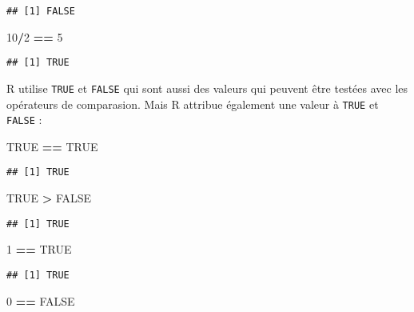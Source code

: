 \documentclass[]{book}
\newenvironment{Shaded}{\begin{snugshade}}{\end{snugshade}}
\newcommand{\DecValTok}[1]{\textcolor[rgb]{0.00,0.00,0.81}{#1}}
\newcommand{\StringTok}[1]{\textcolor[rgb]{0.31,0.60,0.02}{#1}}
\newcommand{\OtherTok}[1]{\textcolor[rgb]{0.56,0.35,0.01}{#1}}
\newcommand{\OperatorTok}[1]{\textcolor[rgb]{0.81,0.36,0.00}{\textbf{#1}}}
\theoremstyle{definition}
\theoremstyle{definition}
\theoremstyle{definition}
\theoremstyle{remark}
\begin{document}
\begin{verbatim}
## [1] FALSE
\end{verbatim}

\begin{Shaded}
\begin{Highlighting}[]
\DecValTok{10}\OperatorTok{/}\DecValTok{2} \OperatorTok{==}\StringTok{ }\DecValTok{5}
\end{Highlighting}
\end{Shaded}

\begin{verbatim}
## [1] TRUE
\end{verbatim}

R utilise \texttt{TRUE} et \texttt{FALSE} qui sont aussi des valeurs qui
peuvent être testées avec les opérateurs de comparasion. Mais R attribue
également une valeur à \texttt{TRUE} et \texttt{FALSE} :

\begin{Shaded}
\begin{Highlighting}[]
\OtherTok{TRUE} \OperatorTok{==}\StringTok{ }\OtherTok{TRUE}
\end{Highlighting}
\end{Shaded}

\begin{verbatim}
## [1] TRUE
\end{verbatim}

\begin{Shaded}
\begin{Highlighting}[]
\OtherTok{TRUE} \OperatorTok{>}\StringTok{ }\OtherTok{FALSE}
\end{Highlighting}
\end{Shaded}

\begin{verbatim}
## [1] TRUE
\end{verbatim}

\begin{Shaded}
\begin{Highlighting}[]
\DecValTok{1} \OperatorTok{==}\StringTok{ }\OtherTok{TRUE}
\end{Highlighting}
\end{Shaded}

\begin{verbatim}
## [1] TRUE
\end{verbatim}

\begin{Shaded}
\begin{Highlighting}[]
\DecValTok{0} \OperatorTok{==}\StringTok{ }\OtherTok{FALSE}
\end{Highlighting}
\end{Shaded}
\end{document}
